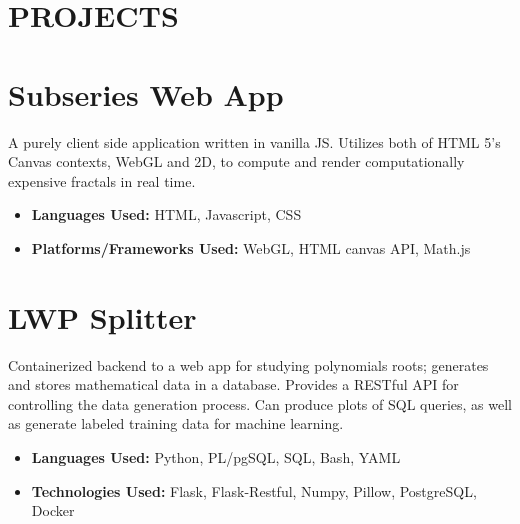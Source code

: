 \documentclass[margin]{res}
\begin{document}
  

\address{Email: raphaelreyna@protonmail.com \\
  Phone: (626) 384-1342 \\
  Site: www.raphaelreyna.works}
                           
                        
\begin{resume} 
\section{PROJECTS}
  
\normalsize{\section{Subseries Web App}}
A purely client side application written in vanilla JS.
Utilizes both of HTML 5's Canvas contexts, WebGL and 2D, to compute and render computationally expensive fractals in real
time.
\begin{multicols}{2}
\begin{itemize}
\item {\bf Languages Used: }\newline HTML, Javascript, CSS
  \columnbreak
\item {\bf Platforms/Frameworks Used: }\newline WebGL, HTML canvas API, Math.js
\end{itemize}
\end{multicols}

\normalsize{\section{LWP Splitter}}
Containerized backend to a web app for studying polynomials roots;
generates and stores mathematical data in a database.
Provides a RESTful API for controlling the data generation process.
Can produce plots of SQL queries, as well as generate labeled training data for machine learning.
\begin{multicols}{2}
\begin{itemize}
\item {\bf Languages Used: }\newline
  Python, PL/pgSQL, SQL, Bash, YAML
  \columnbreak
\item {\bf Technologies Used: } \newline
  Flask, Flask-Restful, Numpy, Pillow, PostgreSQL, Docker
\end{itemize}
\end{multicols}


\end{resume}
\end{document}
